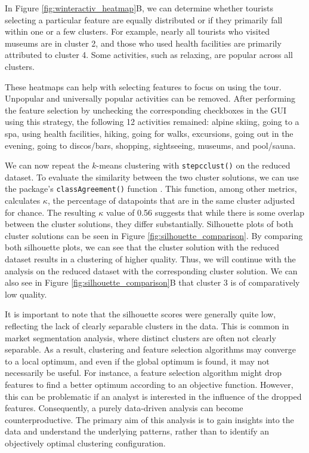 \documentclass[article]{ajs}
\begin{document}
In Figure \ref{fig:winteractiv_heatmap}B, we can determine whether tourists selecting a particular feature are equally distributed or if they primarily fall within one or a few clusters. For example, nearly all tourists who visited museums are in cluster 2, and those who used health facilities are primarily attributed to cluster 4. Some activities, such as relaxing, are popular across all clusters.

These heatmaps can help with selecting features to focus on using the tour. Unpopular and universally popular activities can be removed. After performing the feature selection by unchecking the corresponding checkboxes in the GUI using this strategy, the following 12 activities remained: alpine skiing, going to a spa, using health facilities, hiking, going for walks, excursions, going out in the evening, going to discos/bars, shopping, sightseeing, museums, and pool/sauna.

We can now repeat the $k$-means clustering with \texttt{stepcclust()} on the reduced dataset. To evaluate the similarity between the two cluster solutions, we can use the  package's \texttt{classAgreement()} function \citep{e1071}. This function, among other metrics, calculates $\kappa$, the percentage of datapoints that are in the same cluster adjusted for chance. The resulting $\kappa$ value of 0.56 suggests that while there is some overlap between the cluster solutions, they differ substantially. Silhouette plots of both cluster solutions can be seen in Figure \ref{fig:silhouette_comparison}. By comparing both silhouette plots, we can see that the cluster solution with the reduced dataset results in a clustering of higher quality. Thus, we will continue with the analysis on the reduced dataset with the corresponding cluster solution. We can also see in Figure \ref{fig:silhouette_comparison}B that cluster 3 is of comparatively low quality.

It is important to note that the silhouette scores were generally quite low, reflecting the lack of clearly separable clusters in the data. This is common in market segmentation analysis, where distinct clusters are often not clearly separable. As a result, clustering and feature selection algorithms may converge to a local optimum, and even if the global optimum is found, it may not necessarily be useful. For instance, a feature selection algorithm might drop features to find a better optimum according to an objective function. However, this can be problematic if an analyst is interested in the influence of the dropped features. Consequently, a purely data-driven analysis can become counterproductive. The primary aim of this analysis is to gain insights into the data and understand the underlying patterns, rather than to identify an objectively optimal clustering configuration.
\end{document}
